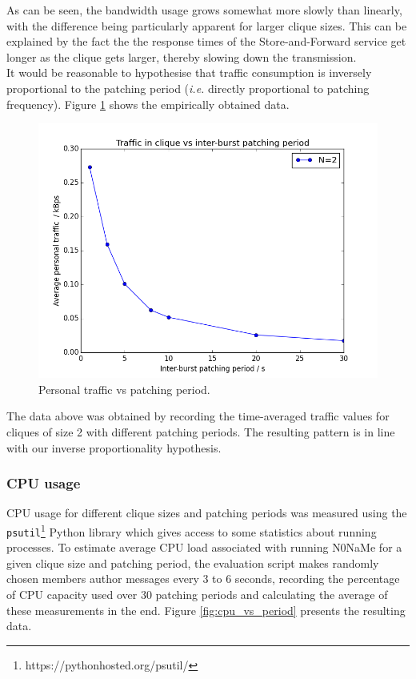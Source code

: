\documentclass[a4paper, twoside, 12pt]{report}
\newcommand{\funkytt}{\fontfamily{AnonymousPro}\selectfont}
\begin{document}
As can be seen, the bandwidth usage grows somewhat more slowly than linearly, with the difference being particularly apparent for larger clique sizes. This can be explained by the fact the the response times of the Store-and-Forward service get longer as the clique gets larger, thereby slowing down the transmission. \\

It would be reasonable to hypothesise that traffic consumption is inversely proportional to the patching period (\textit{i.e.} directly proportional to patching frequency). Figure \ref{fig:traf_vs_period} shows the empirically obtained data.

\begin{figure}[H]
    \captionsetup{width=0.9\textwidth}
    \centering
    \includegraphics[width=0.65\linewidth]{pics/eval/traf_vs_period.png}
    \caption{\label{fig:traf_vs_period} Personal traffic vs patching period.}
\end{figure}

The data above was obtained by recording the time-averaged traffic values for cliques of size 2 with different patching periods. The resulting pattern is in line with our inverse proportionality hypothesis.

\subsubsection{CPU usage}
CPU usage for different clique sizes and patching periods was measured using the \texttt{psutil}\footnote{https://pythonhosted.org/psutil/} Python library which gives access to some statistics about running processes. To estimate average CPU load associated with running {\funkytt N0NaMe} for a given clique size and patching period, the evaluation script makes randomly chosen members author messages every 3 to 6 seconds, recording the percentage of CPU capacity used over 30 patching periods and calculating the average of these measurements in the end. Figure \ref{fig:cpu_vs_period} presents the resulting data. \\
\end{document}

